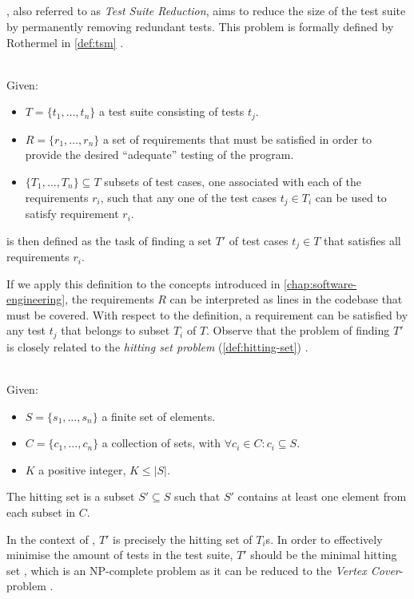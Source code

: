 
\subsection{\tsm{}}
\label{ssec:tsm}
\tsm{}, also referred to as \emph{Test Suite Reduction}, aims to reduce the size of the test suite by permanently removing redundant tests. This problem is formally defined by Rothermel in \autoref{def:tsm} \cite{10.1002/stv.430}. 

\begin{definition}[\tsm{}]
\label{def:tsm}
\mbox{}\\Given:
\begin{itemize}
	\item $T = \{t_1, \dots, t_n\}$ a test suite consisting of tests $t_j$.
	\item $R = \{r_1, \dots, r_n\}$ a set of requirements that must be satisfied in order to provide the desired ``adequate'' testing of the program.
	\item $\{T_1, \dots, T_n\} \subseteq T$ subsets of test cases, one associated with each of the requirements $r_i$, such that any one of the test cases $t_j \in T_i$ can be used to satisfy requirement $r_i$.
\end{itemize}

\noindent \tsm{} is then defined as the task of finding a set $T'$ of test cases $t_j \in T$ that satisfies all requirements $r_i$.
\end{definition}

\noindent If we apply this definition to the concepts introduced in \autoref{chap:software-engineering}, the requirements $R$ can be interpreted as lines in the codebase that must be covered. With respect to the definition, a requirement can be satisfied by any test $t_j$ that belongs to subset $T_i$ of $T$. Observe that the problem of finding $T'$ is closely related to the \emph{hitting set problem} (\autoref{def:hitting-set}) \cite{10.1002/stv.430}.

\begin{definition}
\label{def:hitting-set}
\mbox{}\\Given:
\begin{itemize}
	\item $S = \{s_1, \dots, s_n\}$ a finite set of elements.
	\item $C = \{c_1, \dots, c_n\}$ a collection of sets, with $\forall c_i \in C : c_i \subseteq S$.
	\item $K$ a positive integer, $K \le |S|$.
\end{itemize}

\noindent The hitting set is a subset $S' \subseteq S$ such that $S'$ contains at least one element from each subset in $C$.
\end{definition}

\noindent In the context of \tsm{}, $T'$ is precisely the hitting set of $T_i$s. In order to effectively minimise the amount of tests in the test suite, $T'$ should be the minimal hitting set \cite{10.1002/stv.430}, which is an NP-complete problem as it can be reduced to the \emph{Vertex Cover}-problem \cite{10.5555/574848}.